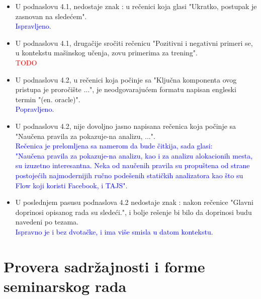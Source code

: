 \documentclass[a4paper]{report}
\newcommand{\odgovor}[1]{\textcolor{blue}{#1}}
\newcommand{\todo}[1]{\textcolor{red}{#1}}
\begin{document}
\begin{itemize}
	\item U podnaslovu 4.1, nedostaje znak : u rečenici koja glasi "Ukratko, postupak je zasnovan na sledećem".
	\\\odgovor{Ispravljeno.}

    \item U podnaslovu 4.1, drugačije sročiti rečenicu "Pozitivni i negativni primeri se, u kontekstu mašinskog učenja, zovu primerima za trening".
    \\\todo{TODO}

    \item U podnaslovu 4.2, u rečenici koja počinje sa "Ključna komponenta ovog pristupa je proročište ...", je neodgovarajućem formatu napisan engleski termin "(en. oracle)".
    \\\odgovor{Popravljeno.}

    \item U podnaslovu 4.2, nije dovoljno jasno napisana rečenica koja počinje sa "Naučena pravila za pokazuje-na analizu, ...".
    \\\odgovor{Rečenica je prelomljena sa namerom da bude čitkija, sada glasi:\\
    	"Naučena pravila za pokazuje-na analizu, kao i za
    	analizu alokacionih mesta, su izuzetno interesantna. Neka od naučenih pravila su propuštena od
    	strane postojećih najmodernijih ručno podešenih statičkih analizatora kao što
    	su Flow koji koristi Facebook, i TAJS".
    }

    \item U poslednjem pasusu podnaslova 4.2 nedostaje znak : nakon rečenice "Glavni doprinosi opisanog rada su sledeći.", i bolje rešenje bi bilo da doprinosi budu navedeni po tezama.
    \\\odgovor{Ispravno je i bez dvotačke, i ima više smisla u datom kontekstu.}
\end{itemize}


\section{Provera sadržajnosti i forme seminarskog rada}
\end{document}
